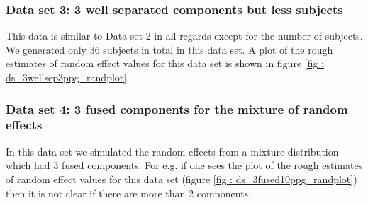 \subsubsection{Data set 3: 3 well separated components but less subjects}
\label{subsubsec : ds_3wellsep_3ppg}
This data is similar to Data set 2 in all regards except for the number of subjects. We generated only 36 subjects in total in this data set. A plot of the rough estimates of random effect values for this data set is shown in figure \ref{fig : ds_3wellsep3ppg_randplot}.

\subsubsection{Data set 4: 3 fused components for the mixture of random effects}
\label{subsubsec : ds_3fused_10ppg}
In this data set we simulated the random effects from a mixture distribution which had 3 fused components. For e.g. if one sees the plot of the rough estimates of random effect values for this data set (figure \ref{fig : ds_3fused10ppg_randplot}) then it is not clear if there are more than 2 components.

